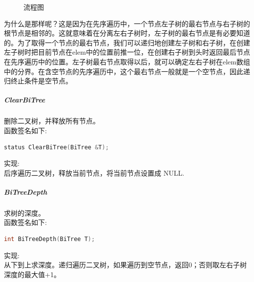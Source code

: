 \documentclass[supercite]{Experimental_Report}
\theoremstyle{definition}
\begin{document}
\begin{figure}[htbp]
	\centering
	\centering
	\caption{流程图}
	\label{fig6-104}
\end{figure}
\noindent
为什么是那样呢？这是因为在先序遍历中，一个节点左子树的最右节点与右子树的根节点是相邻的。这就意味着在分离左右子树时，左子树的最右节点是有必要知道的。为了取得一个节点的最右节点，我们可以递归地创建左子树和右子树，在创建左子树时把目前节点在elem中的位置前推一位，在创建右子树到头时返回最后节点在先序遍历中的位置。左子树最右节点取得以后，就可以确定左右子树在elem数组中的分界。在含空节点的先序遍历中，这个最右节点一般就是一个空节点，因此递归终止条件是空节点。 \\

\clearpage
\subparagraph{ClearBiTree}
\noindent
删除二叉树，并释放所有节点。\\
函数签名如下:
\begin{lstlisting}[language=C++, frame=single]
status ClearBiTree(BiTree &T);
\end{lstlisting}
实现: \\
后序遍历二叉树，释放当前节点，将当前节点设置成 NULL. \\

\subparagraph{BiTreeDepth}
\noindent
求树的深度。 \\
函数签名如下:
\begin{lstlisting}[language=C++, frame=single]
int BiTreeDepth(BiTree T);
\end{lstlisting}
实现: \\
从下到上求深度。递归遍历二叉树，如果遍历到空节点，返回0；否则取左右子树深度的最大值+1。 \\
\end{document}
